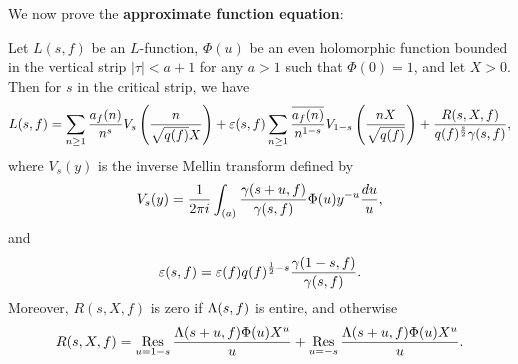     We now prove the \textbf{approximate function equation}:

    \begin{theorem*}
      Let $L(s,f)$ be an $L$-function, $\Phi(u)$ be an even holomorphic function bounded in the vertical strip $|\tau| < a+1$ for any $a > 1$ such that $\Phi(0) = 1$, and let $X > 0$. Then for $s$ in the critical strip, we have
      \[
        L(s,f) = \sum_{n \ge 1}\frac{a_{f}(n)}{n^{s}}V_{s}\left(\frac{n}{\sqrt{q(f)}X}\right)+\varepsilon(s,f)\sum_{n \ge 1}\frac{\overline{a_{f}(n)}}{n^{1-s}}V_{1-s}\left(\frac{nX}{\sqrt{q(f)}}\right)+\frac{R(s,X,f)}{q(f)^{\frac{s}{2}}\gamma(s,f)},
      \]
      where $V_{s}(y)$ is the inverse Mellin transform defined by
      \[
        V_{s}(y) = \frac{1}{2\pi i}\int_{(a)}\frac{\gamma(s+u,f)}{\gamma(s,f)}\Phi(u)y^{-u}\frac{du}{u},
      \]
      and
      \[
        \varepsilon(s,f) = \varepsilon(f)q(f)^{\frac{1}{2}-s}\frac{\gamma(1-s,f)}{\gamma(s,f)}.
      \]
      Moreover, $R(s,X,f)$ is zero if $\Lambda(s,f)$ is entire, and otherwise
      \[
        R(s,X,f) = \operatorname*{\mathrm{Res}}_{u = 1-s}\frac{\Lambda(s+u,f)\Phi(u)X^{u}}{u}+\operatorname*{\mathrm{Res}}_{u = -s}\frac{\Lambda(s+u,f)\Phi(u)X^{u}}{u}.
      \]
    \end{theorem*}
